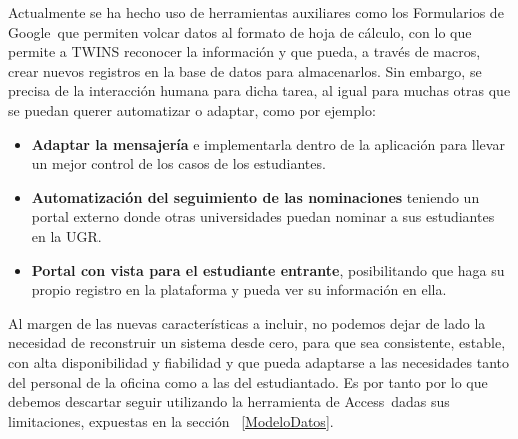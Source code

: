 Actualmente se ha hecho uso de herramientas auxiliares como los Formularios de Google\textregistered \ que permiten volcar datos al formato de hoja de cálculo, con lo que permite a TWINS reconocer la información y que pueda, a través de macros, crear nuevos registros en la base de datos para almacenarlos. Sin embargo, se precisa de la interacción humana para dicha tarea, al igual para muchas otras que se puedan querer automatizar o adaptar, como por ejemplo:

\begin{itemize}
	\item \textbf{Adaptar la mensajería} e implementarla dentro de la aplicación para llevar un mejor control de los casos de los estudiantes.
	\item \textbf{Automatización del seguimiento de las nominaciones} teniendo un portal externo donde otras universidades puedan nominar a sus estudiantes en la UGR.
	\item \textbf{Portal con vista para el estudiante entrante}, posibilitando que haga su propio registro en la plataforma y pueda ver su información en ella.
\end{itemize}

Al margen de las nuevas características a incluir, no podemos dejar de lado la necesidad de reconstruir un sistema desde cero, para que sea consistente, estable, con alta disponibilidad y fiabilidad y que pueda adaptarse a las necesidades tanto del personal de la oficina como a las del estudiantado. Es por tanto por lo que debemos descartar seguir utilizando la herramienta de Access\textregistered \ dadas sus limitaciones, expuestas en la sección ~\ref{ModeloDatos}.